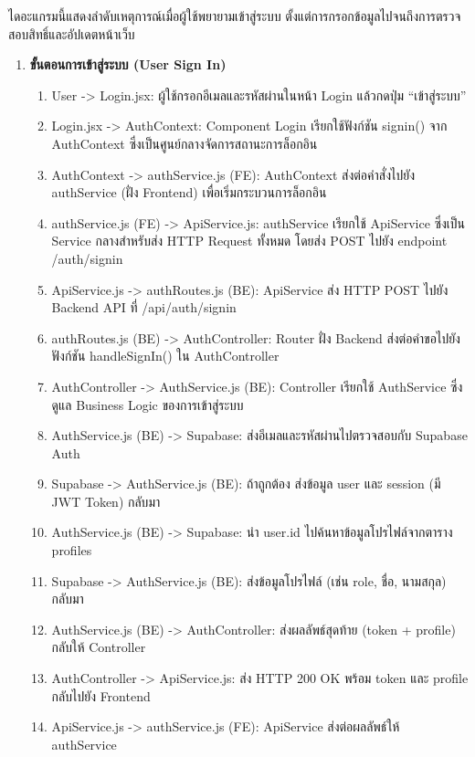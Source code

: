 \indent ไดอะแกรมนี้แสดงลำดับเหตุการณ์เมื่อผู้ใช้พยายามเข้าสู่ระบบ ตั้งแต่การกรอกข้อมูลไปจนถึงการตรวจสอบสิทธิ์และอัปเดตหน้าเว็บ


\begin{sloppypar}
	\begin{enumerate}
		\item \textbf{ขั้นตอนการเข้าสู่ระบบ (User Sign In)}
		\begin{enumerate}
			\item User -> Login.jsx: ผู้ใช้กรอกอีเมลและรหัสผ่านในหน้า Login แล้วกดปุ่ม “เข้าสู่ระบบ”
			\item Login.jsx -> AuthContext: Component Login เรียกใช้ฟังก์ชัน signin() จาก AuthContext ซึ่งเป็นศูนย์กลางจัดการสถานะการล็อกอิน
			\item AuthContext -> authService.js (FE): AuthContext ส่งต่อคำสั่งไปยัง authService (ฝั่ง Frontend) เพื่อเริ่มกระบวนการล็อกอิน
			\item authService.js (FE) -> ApiService.js: authService เรียกใช้ ApiService ซึ่งเป็น Service กลางสำหรับส่ง HTTP Request ทั้งหมด โดยส่ง POST ไปยัง endpoint /auth/signin
			\item ApiService.js -> authRoutes.js (BE): ApiService ส่ง HTTP POST ไปยัง Backend API ที่ /api/auth/signin
			\item authRoutes.js (BE) -> AuthController: Router ฝั่ง Backend ส่งต่อคำขอไปยังฟังก์ชัน handleSignIn() ใน AuthController
			\item AuthController -> AuthService.js (BE): Controller เรียกใช้ AuthService ซึ่งดูแล Business Logic ของการเข้าสู่ระบบ
			\item AuthService.js (BE) -> Supabase: ส่งอีเมลและรหัสผ่านไปตรวจสอบกับ Supabase Auth
			\item Supabase -> AuthService.js (BE): ถ้าถูกต้อง ส่งข้อมูล user และ session (มี JWT Token) กลับมา
			\item AuthService.js (BE) -> Supabase: นำ user.id ไปค้นหาข้อมูลโปรไฟล์จากตาราง profiles
			\item Supabase -> AuthService.js (BE): ส่งข้อมูลโปรไฟล์ (เช่น role, ชื่อ, นามสกุล) กลับมา
			\item AuthService.js (BE) -> AuthController: ส่งผลลัพธ์สุดท้าย (token + profile) กลับให้ Controller
			\item AuthController -> ApiService.js: ส่ง HTTP 200 OK พร้อม token และ profile กลับไปยัง Frontend
			\item ApiService.js -> authService.js (FE): ApiService ส่งต่อผลลัพธ์ให้ authService

\end{enumerate}
\end{enumerate}
\end{sloppypar}
